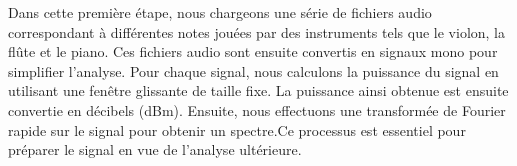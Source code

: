Dans cette première étape, nous chargeons une série de fichiers audio correspondant à différentes notes jouées par des instruments tels que le violon, la flûte et le piano. Ces fichiers audio sont ensuite convertis en signaux mono pour simplifier l'analyse. Pour chaque signal, nous calculons la puissance du signal en utilisant une fenêtre glissante de taille fixe. La puissance ainsi obtenue est ensuite convertie en décibels (dBm). Ensuite, nous effectuons une transformée de Fourier rapide sur le signal pour obtenir un spectre.Ce processus est essentiel pour préparer le signal en vue de l'analyse ultérieure. 